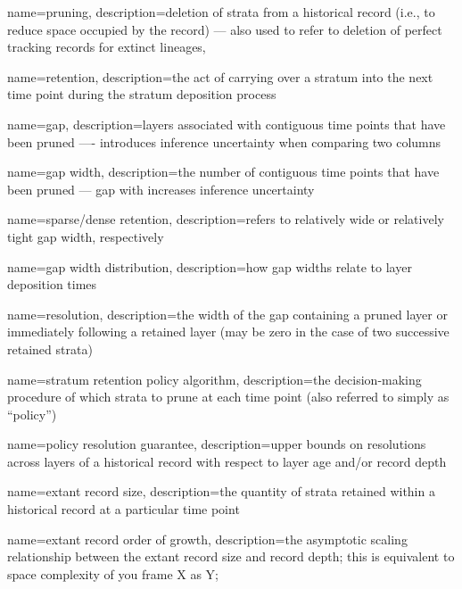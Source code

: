 {
    name=pruning,
    description={deletion of strata from a historical record (i.e., to reduce space occupied by the record) --- also used to refer to deletion of perfect tracking records for extinct lineages,}
}

{
    name=retention,
    description={the act of carrying over a stratum into the next time point during the stratum deposition process}
}

{
    name=gap,
    description={layers associated with contiguous time points that have been pruned ---- introduces inference uncertainty when comparing two columns}
}

{
    name=gap width,
    description={the number of contiguous time points that have been pruned --- gap with increases inference uncertainty}
}

{
    name=sparse/dense retention,
    description={refers to relatively wide or relatively tight gap width, respectively}
}

{
    name=gap width distribution,
    description={how gap widths relate to layer deposition times}
}

{
    name=resolution,
    description={the width of the gap containing a pruned layer or immediately following a retained layer (may be zero in the case of two successive retained strata)}
}

{
    name=stratum retention policy algorithm,
    description={the decision-making procedure of which strata to prune at each time point (also referred to simply as ``policy'')}
}

{
    name=policy resolution guarantee,
    description={upper bounds on resolutions across layers of a historical record with respect to layer age and/or record depth}
}

{
    name=extant record size,
    description={the quantity of strata retained within a historical record at a particular time point}
}

{
    name=extant record order of growth,
    description={the asymptotic scaling relationship between the extant record size and record depth; this is equivalent to space complexity of you frame X as Y;}
}

